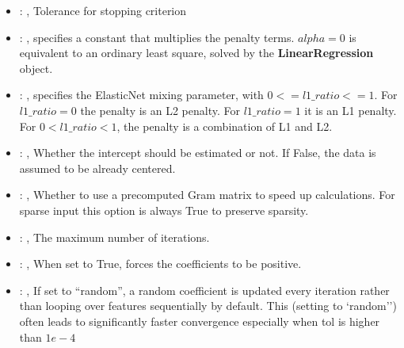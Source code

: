 \begin{itemize}
    \item {}: , 
      Tolerance for stopping criterion

    \item {}: , 
      specifies a constant                                                  that multiplies the
      penalty terms.                                                  $alpha = 0$ is equivalent to
      an ordinary least square, solved by the
      \textbf{LinearRegression} object.

    \item {}: , 
      specifies the                                                  ElasticNet mixing parameter,
      with $0 <= l1\_ratio <= 1$.                                                  For $l1\_ratio =
      0$ the penalty is an L2 penalty.                                                  For
      $l1\_ratio = 1$ it is an L1 penalty.                                                  For $0 <
      l1\_ratio < 1$, the penalty is a combination of L1 and L2.

    \item {}: , 
      Whether the intercept should be estimated or not. If False,
      the data is assumed to be already centered.

    \item {}: , 
      Whether to use a precomputed Gram matrix to speed up calculations.
      For sparse input this option is always True to preserve sparsity.

    \item {}: , 
      The maximum number of iterations.

    \item {}: , 
      When set to True, forces the coefficients to be positive.

    \item {}: , 
      If set to ``random'', a random coefficient is updated every iteration
      rather than looping over features sequentially by default. This (setting to `random'')
      often leads to significantly faster convergence especially when tol is higher than $1e-4$


\end{itemize}
